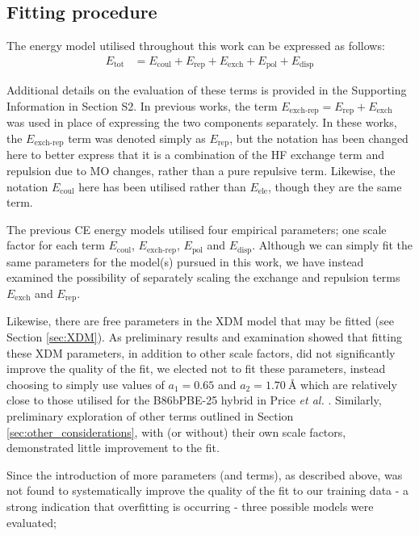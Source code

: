 \documentclass[preprint]{iucr}              %
\begin{document}
\subsection{Fitting procedure}
The energy model utilised throughout this work can be expressed as follows:
\begin{align}
    \label{eqn:ce_energy_model}
    E_\text{tot} &= E_\text{coul} + E_\text{rep} + E_\text{exch} + E_\text{pol} + E_\text{disp}
\end{align}

Additional details on the evaluation of these terms is provided in the Supporting Information in Section S2.
In previous works, the term $E_\text{exch-rep} = E_\text{rep} + E_\text{exch}$ was used in place of expressing the two components separately.
In these works, the $E_\text{exch-rep}$ term was denoted simply as 
$E_\text{rep}$, but the notation has been changed here to better express that it is a combination of the HF exchange term and repulsion due to MO changes, rather than a pure repulsive term. Likewise, the notation $E_\text{coul}$ here has been utilised rather than $E_\text{ele}$, though they are the same term.

The previous CE energy models utilised four empirical parameters; one scale factor for each term 
$E_\text{coul}$, $E_\text{exch-rep}$, $E_\text{pol}$ and $E_\text{disp}$. Although we can simply fit the same parameters for the model(s) pursued in this work, we have instead examined the possibility of separately scaling the exchange and repulsion terms $E_\text{exch}$ and $E_\text{rep}$.

Likewise, there are free parameters in the XDM model that may be fitted (see Section \ref{sec:XDM}). 
As preliminary results and examination showed that fitting these XDM parameters, in addition to other scale factors, did not significantly
improve the quality of the fit, we elected not to fit these parameters, instead choosing to simply use values of $a_1=0.65$ and $a_2=1.70\ \text{\AA}$
which are relatively close to those utilised for the B86bPBE-25 hybrid in Price \textit{et al.} \cite{Price2023}. 
Similarly, preliminary exploration of other terms outlined in Section \ref{sec:other_considerations}, 
with (or without) their own scale factors, demonstrated little improvement to the fit.

Since the introduction of more parameters (and terms), as described above, was not found to systematically improve the quality of the fit to our training data - a strong indication that overfitting is occurring - three possible models were evaluated; 
\end{document}
